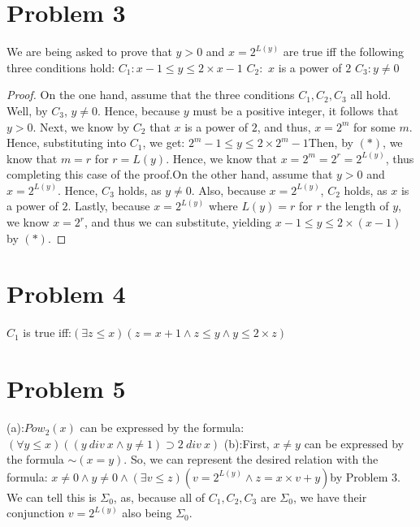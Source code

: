 \documentclass{article}
\newcommand*{\oldneg}{\mathord{\sim}}
\theoremstyle{definition}
\begin{document}
\section*{Problem 3}
We are being asked to prove that $y>0$ and $x=2^{L(y)}$ are true iff the following three conditions hold:\newline
$C_1: x-1\le y\le 2\times x-1$\newline
$C_2:$ $x$ is a power of $2$\newline
$C_3:y\ne 0$
\begin{proof}
On the one hand, assume that the three conditions $C_1, C_2, C_3$ all hold. Well, by $C_3$, $y\ne 0$. Hence, because $y$ must be a positive integer, 
it follows that $y>0$. Next, we know by $C_2$ that $x$ is a power of $2$, and thus, $x=2^m$ for some $m$. Hence, substituting into $C_1$, we get:\newline
$2^m-1\le y\le 2\times 2^m-1$\newline Then, by $(*)$, we know that $m=r$ for $r=L(y)$. Hence, we know that $x=2^m=2^r=2^{L(y)}$, thus completing this case of
 the proof.\newline \newline On the other hand, assume that $y>0$ and $x=2^{L(y)}$. Hence, $C_3$ holds, as $y\ne 0$. Also, because $x=2^{L(y)}$,
 $C_2$ holds, as $x$ is a power of $2$. Lastly, because $x=2^{L(y)}$ where $L(y)=r$ for $r$ the length of $y$, we know $x=2^r$, and thus we can substitute,
 yielding $x-1\le y\le 2\times (x-1)$ by $(*)$. 
\end{proof}
\section*{Problem 4}
$C_1$ is true iff:\newline $(\exists z\le x)(z=x+1\wedge z\le y\wedge y\le 2\times z)$
\section*{Problem 5}
(a):\newline $Pow_2(x)$ can be expressed by the formula:\newline $(\forall y\le x)((y\ div\ x\wedge y\ne 1)\supset 2\ div\ x)$
\newline (b):\newline First, $x\ne y$ can be expressed by the formula $\oldneg (x=y)$. So, we can represent the desired relation with the formula:\newline
$x\ne 0\wedge y\ne 0\wedge (\exists v\le z)(v=2^{L(y)}\wedge z=x\times v+y)$\newline by Problem 3. We can tell this is $\Sigma_0$, 
as, because all of $C_1, C_2, C_3$ are $\Sigma_0$, we have their conjunction $v=2^{L(y)}$ also being $\Sigma_0$.
\end{document}
